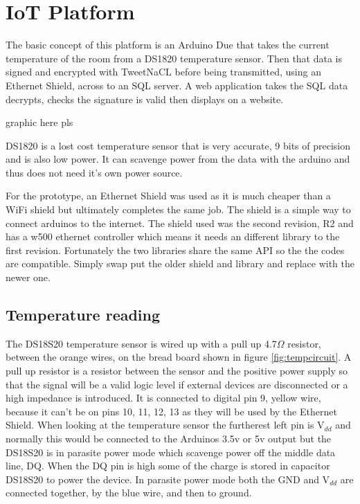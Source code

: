 \section{IoT Platform}

The basic concept of this platform is an Arduino Due that takes the current temperature of the room from a DS1820 temperature sensor. Then that data is signed and encrypted with TweetNaCL before being transmitted, using an Ethernet Shield, across to an SQL server. A web application takes the SQL data decrypts, checks the signature is valid then displays on a website. 

graphic here pls


DS1820 is a lost cost temperature sensor that is very accurate, 9 bits of precision and is also low power. It can scavenge power from the data with the arduino and thus does not need it's own power source. 

For the prototype, an Ethernet Shield was used as it is much cheaper than a WiFi shield but ultimately completes the same job. The shield is a simple way to connect arduinos to the internet. The shield used was the second revision, R2 and has a w500 ethernet controller which means it needs an different library to the first revision. Fortunately the two libraries share the same API so the the codes are compatible. Simply swap put the older shield and library and replace with the newer one.


\subsection{Temperature reading}

The DS18S20 temperature sensor is wired up with a pull up 4.7$\Omega$ resistor, between the orange wires, on the bread board shown in figure \ref{fig:tempcircuit}. A pull up resistor is a resistor between the sensor and the positive power supply so that the signal will be a valid logic level if external devices are disconnected or a high impedance is introduced. It is connected to digital pin 9, yellow wire, because it can't be on pins 10, 11, 12, 13 as they will be used by the Ethernet Shield. When looking at the temperature sensor the furtherest left pin is V$_{dd}$ and normally this would be connected to the Arduinos 3.5v or 5v output but the DS18S20 is in parasite power mode which scavenge power off the middle data line, DQ. When the DQ pin is high some of the charge is stored in capacitor DS18S20 to power the device. In parasite power mode both the GND and V$_{dd}$ are connected together, by the blue wire, and then to ground.


